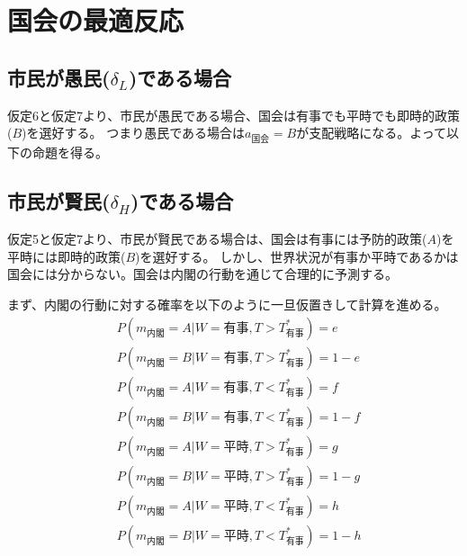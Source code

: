 \documentclass[main.tex]{subfiles}
\begin{document}
\section{国会の最適反応}


\subsection{市民が愚民($\delta_L$)である場合}

仮定6と仮定7より、市民が愚民である場合、国会は有事でも平時でも即時的政策($B$)を選好する。
つまり愚民である場合は$a_{国会}=B$が支配戦略になる。よって以下の命題を得る。



\subsection{市民が賢民($\delta_H$)である場合}

仮定5と仮定7より、市民が賢民である場合は、国会は有事には予防的政策($A$)を平時には即時的政策($B$)を選好する。
しかし、世界状況が有事か平時であるかは国会には分からない。国会は内閣の行動を通じて合理的に予測する。

まず、内閣の行動に対する確率を以下のように一旦仮置きして計算を進める。
\begin{align*}
    & P(m_{内閣} = A| W = {有事}, T > T^*_{有事}) = e \\
    & P(m_{内閣} = B| W = {有事}, T > T^*_{有事} ) = 1-e \\
    & P(m_{内閣} = A| W = {有事}, T < T^*_{有事}) = f \\
    & P(m_{内閣} = B| W = {有事}, T < T^*_{有事} ) = 1-f \\
    & P(m_{内閣} = A| W = {平時}, T > T^*_{有事}) = g \\
    & P(m_{内閣} = B| W = {平時}, T > T^*_{有事} ) = 1-g \\
    & P(m_{内閣} = A| W = {平時}, T < T^*_{有事}) = h \\
    & P(m_{内閣} = B| W = {平時}, T < T^*_{有事} ) = 1-h
\end{align*}
\end{document}
